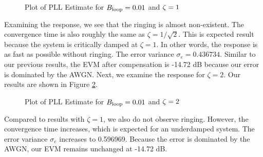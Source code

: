 \documentclass{article}
\begin{document}
\begin{figure}[H]
	\centerline{}
	\caption{Plot of PLL Estimate for $\protect{B_\text{loop}} = 0.01$ and $\protect{\zeta = 1}$}
	\label{fig::convergence_Bloop_0p01_damp_1}
\end{figure}

\noindent Examining the response, we see that the ringing is almost non-existent. The convergence time is also roughly the same as $\zeta = 1/\sqrt{2}$. This is expected result because the system is critically damped at $\zeta = 1$. In other words, the response is as fast as possible without ringing. The error variance $\sigma_e=0.436734$. Similar to our previous results, the EVM after compensation is -14.72 dB because our error is dominated by the AWGN. Next, we examine the response for $\zeta = 2$. Our results are shown in Figure \ref{fig::convergence_Bloop_0p01_damp_2}.

\begin{figure}[H]
	\centerline{}
	\caption{Plot of PLL Estimate for $\protect{B_\text{loop}} = 0.01$ and $\protect{\zeta = 2}$}
	\label{fig::convergence_Bloop_0p01_damp_2}
\end{figure}

\noindent Compared to results with $\zeta = 1$, we also do not observe ringing. However, the convergence time increases, which is expected for an underdamped system. The error variance $\sigma_e$ increases to 0.596969. Because the error is dominated by the AWGN, our EVM remains unchanged at -14.72 dB.
\end{document}
